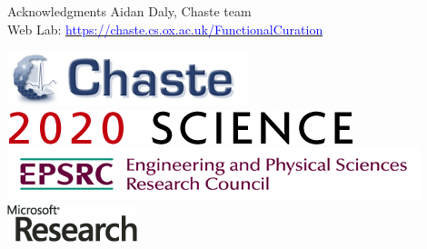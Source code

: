 \documentclass[t,xcolor={usenames,dvipsnames}]{beamer}
\newcommand{\myhref}[2]{\href{#1}{\textcolor{Blue}{#2}}}
\newcommand{\myurl}[1]{\myhref{#1}{#1}}
\begin{document}
\begin{frame}{Acknowledgments}
Aidan Daly, Chaste team\\

Web Lab: \myurl{https://chaste.cs.ox.ac.uk/FunctionalCuration}

\begin{center}
\includegraphics[scale=.9]{chaste-266x60}\\ \vspace{.3cm}
\includegraphics[scale=.7]{logo2020science}\\ \vspace{.4cm}
\includegraphics[width=.55\textwidth]{EPSRC1RGBLO} \hspace{.1cm}
\includegraphics[scale=.55]{logo_msr}
\end{center}
\end{frame}
\end{document}
